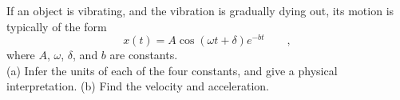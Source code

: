 If an object is vibrating, and the vibration is gradually dying out,
its motion is typically of the form
\begin{equation*}
  x(t) = A\cos(\omega t+\delta)e^{-bt} \qquad ,
\end{equation*}
where $A$, $\omega$, $\delta$, and $b$ are constants.\\
(a) Infer the units of each of the four constants, and give
a physical interpretation.\hwendpart
(b) Find the velocity and acceleration.\answercheck\hwendpart
